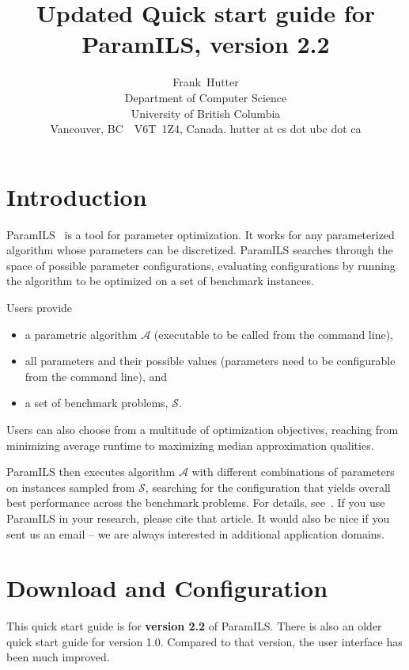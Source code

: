 \documentclass[10pt,letterpaper,twoside]{article}
\begin{document}
\title{Updated Quick start guide for ParamILS, version 2.2}

\author{
    Frank~Hutter\\
    Department of Computer Science\\
	University of British Columbia\\
	Vancouver, BC\ \ V6T~1Z4, Canada.
	hutter at cs dot ubc dot ca
}

\maketitle

\section{Introduction}\label{sec:intro}
ParamILS~\cite{Hut04,HutHooStu07} is a tool for parameter optimization. It works for any parameterized algorithm
whose parameters can be discretized. ParamILS searches through the space of possible
parameter configurations, evaluating configurations by running the algorithm to be
optimized on a set of benchmark instances.

Users provide
\begin{itemize}
	\item a parametric algorithm $\mathcal{A}$ (executable to be called from the command line), 
	\item all parameters and their possible values (parameters need to be configurable from the command line), and
	\item a set of benchmark problems, $\mathcal{S}$.
\end{itemize}
Users can also choose from a multitude of optimization objectives, reaching from
minimizing average runtime to maximizing median approximation qualities.

ParamILS then executes algorithm $\mathcal{A}$ with different combinations of parameters on 
instances sampled from $\mathcal{S}$, searching for the configuration that yields overall
best performance across the benchmark problems. For details, see~\cite{HutHooStu07}.
If you use ParamILS in your research, please cite that article. It would also be nice if you
sent us an email -- we are always interested in additional application domains.

\section{Download and Configuration}\label{sec:config}
This quick start guide is for \textbf{version 2.2} of ParamILS. There is also an older quick start guide for version 1.0.
Compared to that version, the user interface has been much improved.
\end{document}
